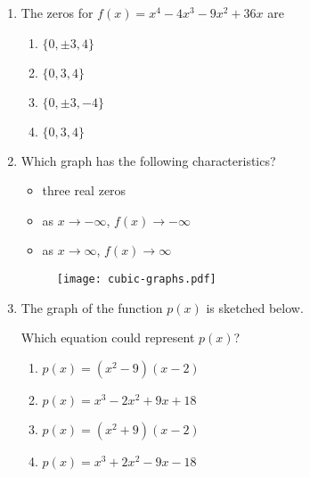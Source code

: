 \documentclass[12pt, twoside]{article}
\begin{document}
\begin{enumerate}
\newpage

\item The zeros for $f(x)=x^4-4x^3-9x^2+36x$ are
\begin{enumerate}
    \item $\{0, \pm 3, 4 \}$
    \item $\{0, 3, 4 \}$
    \item $\{0, \pm 3, -4 \}$
    \item $\{0, 3,4 \}$
\end{enumerate} %

\item Which graph has the following characteristics?
\begin{itemize}
\item three real zeros
\item as $x \rightarrow - \infty$, $f(x) \rightarrow - \infty$
\item as $x \rightarrow \infty$, $f(x) \rightarrow \infty$
\end{itemize}
\begin{figure}[!ht]
    \centering
    \texttt{[image: cubic-graphs.pdf]}
\end{figure} %

\newpage
\item The graph of the function $p(x)$ is sketched below.
\begin{center}
\end{center}
Which equation could represent $p(x)$?
\begin{enumerate}
    \item $p(x)=(x^2- 9)(x-2)$
    \item $p(x)=x^3 -2x^2+ 9x+18$
    \item $p(x)=(x^2+ 9)(x-2)$
    \item $p(x)=x^3 +2x^2- 9x-18$ \\[.5in]
\end{enumerate} %


\end{enumerate}
\end{document}
